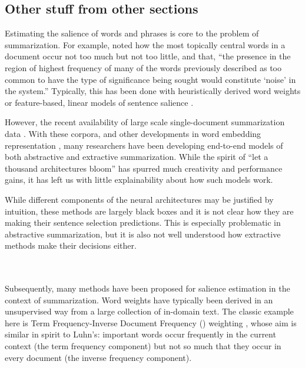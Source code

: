 
\subsection{Other stuff from other sections}
Estimating the salience of words and phrases is core to the problem of 
summarization. For example, \cite{luhn1958automatic} 
noted how the most topically central words in a document occur not too much 
but not
too little, and that,
``the presence in the region of highest frequency of many of the words
 previously described as too common to have the  type  of
 significance being sought would constitute
`noise' in the system.''
Typically, this has been done with heuristically derived word weights
\citep{luhn1958automatic,sparck1972statistical} or feature-based, linear 
models of sentence salience \citep{martins2009summarization,woodsend2010automatic,berg2011jointly,durrett2016learning}.

However, the recent availability of large scale single-document summarization 
data \citep{sandhaus2008new,hermann2015teaching,grusky2018newsroom}. 
With these corpora, and other developments in word embedding representation 
\citep{mikolov2013distributed,pennington2014glove},
many researchers have been developing end-to-end models of both 
abstractive \citep{rush2015neural,chopra2016abstractive,cheng2016neural,nallapati2016abstractive,see2017get,paulus2017deep} and extractive \citep{cheng2016neural,nallapati2016classify,nallapati2016summarunner,narayan2018ranking} summarization.
While the spirit of ``let a thousand architectures bloom'' has spurred much
creativity and performance gains, it has left us with little explainability
about how such models work. 

While different components of the neural architectures may be justified 
by intuition, these methods are largely black boxes and it is not clear
how they are making their sentence selection predictions. This is especially
problematic in abstractive summarization, but it is also not well understood
how extractive methods make their decisions either.




~\\
~\\





Subsequently, many methods have been proposed for salience estimation
in the context of summarization. Word weights have typically been derived
in an unsupervised way from a large collection of in-domain text.
The classic example here is Term Frequency-Inverse Document Frequency
(\tfidf) weighting \citep{sparck1972statistical}, whose aim is similar in 
spirit to Luhn's: important 
words occur frequently in the current context (the term frequency component)
 but not so much that they occur in every document 
(the inverse frequency component).

